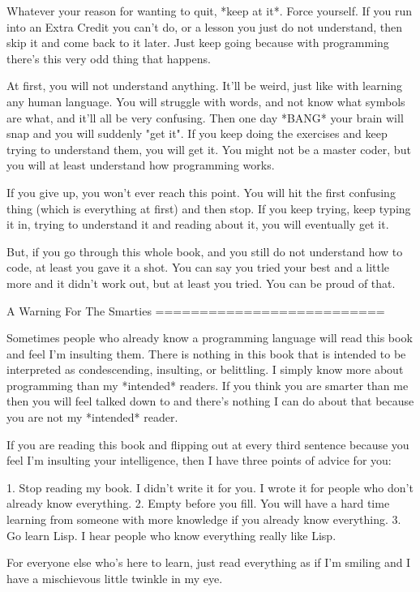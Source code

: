 Whatever your reason for wanting to quit, *keep at it*.  Force yourself.  If
you run into an Extra Credit you can't do, or a lesson you just do not understand, then
skip it and come back to it later.  Just keep going because with programming
there's this very odd thing that happens.

At first, you will not understand anything.  It'll be weird, just like with
learning any human language.  You will struggle with words, and not know what
symbols are what, and it'll all be very confusing.  Then one day *BANG* your
brain will snap and you will suddenly "get it".  If you keep doing the exercises
and keep trying to understand them, you will get it.  You might not be a master
coder, but you will at least understand how programming works.

If you give up, you won't ever reach this point.  You will hit the first
confusing thing (which is everything at first) and then stop.  If you keep
trying, keep typing it in, trying to understand it and reading about it, 
you will eventually get it.

But, if you go through this whole book, and you still do not understand how to
code, at least you gave it a shot.  You can say you tried your best and a
little more and it didn't work out, but at least you tried.  You can be proud
of that.


A Warning For The Smarties
==========================

Sometimes people who already know a programming language will read this book
and feel I'm insulting them.  There is nothing in this book that is intended to
be interpreted as condescending, insulting, or belittling.  I simply know more
about programming than my *intended* readers.  If you think you are smarter
than me then you will feel talked down to and there's nothing I can do about
that because you are not my *intended* reader.

If you are reading this book and flipping out at every third sentence
because you feel I'm insulting your intelligence, then I have three points of
advice for you:

1. Stop reading my book.  I didn't write it for you.  I wrote it for people
   who don't already know everything.
2. Empty before you fill.  You will have a hard time learning from someone
   with more knowledge if you already know everything.
3. Go learn Lisp.  I hear people who know everything really like Lisp.

For everyone else who's here to learn, just read everything as if I'm smiling
and I have a mischievous little twinkle in my eye.


